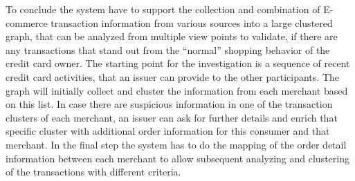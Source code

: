 To conclude the system have to support the collection and combination of \gls{E-commerce} transaction information from various sources into a large clustered graph, that can be analyzed from multiple view points to validate, if there are any transactions that stand out from the ``normal'' shopping behavior of the credit card owner. The starting point for the investigation is a sequence of recent credit card activities, that an issuer can provide to the other participants. The graph will initially collect and cluster the information from each merchant based on this list. In case there are suspicious information in one of the transaction clusters of each merchant, an issuer can ask for further details and enrich that specific cluster with additional order information for this consumer and that merchant. In the final step the system has to do the mapping of the order detail information between each merchant to allow subsequent analyzing and clustering of the transactions with different criteria.

